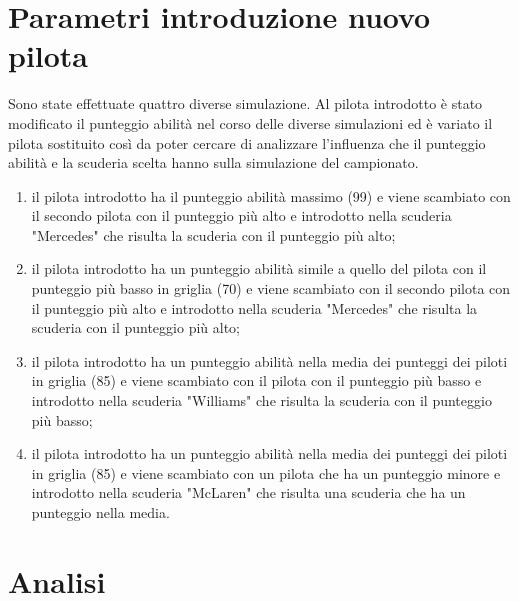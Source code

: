 \section[Parametri introduzione nuovo pilota]{Parametri introduzione nuovo pilota} %
Sono state effettuate quattro diverse simulazione. Al pilota introdotto è stato modificato il punteggio abilità nel corso delle diverse simulazioni ed è variato il pilota sostituito così da poter cercare di analizzare l'influenza che il punteggio abilità e la scuderia scelta hanno sulla simulazione del campionato.
\begin{enumerate}
    \item il pilota introdotto ha il punteggio abilità massimo (99) e viene scambiato con il secondo pilota con il punteggio più alto e introdotto nella scuderia "Mercedes" che risulta la scuderia con il punteggio più alto;
    \item il pilota introdotto ha un punteggio abilità simile a quello del pilota con il punteggio più basso in griglia (70) e viene scambiato con il secondo pilota con il punteggio più alto e introdotto nella scuderia "Mercedes" che risulta la scuderia con il punteggio più alto;
    \item il pilota introdotto ha un punteggio abilità nella media dei punteggi dei piloti in griglia (85) e viene scambiato con il pilota con il punteggio più basso e introdotto nella scuderia "Williams" che risulta la scuderia con il punteggio più basso;
    \item il pilota introdotto ha un punteggio abilità nella media dei punteggi dei piloti in griglia (85) e viene scambiato con un pilota che ha un punteggio minore e introdotto nella scuderia "McLaren" che risulta una scuderia che ha un punteggio nella media.
    \end{enumerate}
\section[Analisi]{Analisi} %

